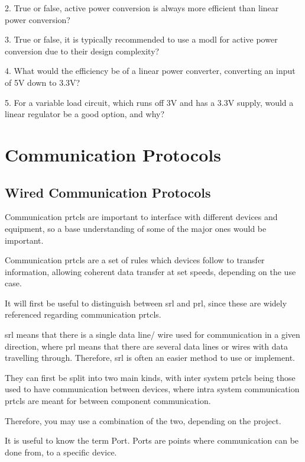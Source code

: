 \documentclass[a4paper,11pt]{report}
\begin{document}
2. True or false, active power conversion is always more efficient than linear power conversion?

3. True or false, it is typically recommended to use a \gls{modl} for active power conversion due to their design complexity?

4. What would the efficiency be of a linear power converter, converting an input of 5V down to 3.3V?

5. For a variable load circuit, which runs off 3V and has a 3.3V supply, would a linear regulator be a good option, and why?

\pagebreak

\section{Communication Protocols}

\vspace*{1\baselineskip}

\subsection{Wired Communication Protocols}

Communication \gls{prtcl}s are important to interface with different devices and equipment, so a base understanding of some of the major ones would be important.

Communication \gls{prtcl}s are a set of rules which devices follow to transfer information, allowing coherent data transfer at set speeds, depending on the use case.

It will first be useful to distinguish between \gls{srl} and \gls{prl}, since these are widely referenced regarding communication \gls{prtcl}s.

\gls{srl} means that there is a single data line/ wire used for communication in a given direction, where \gls{prl} means that there are several data lines or wires with data travelling through. Therefore, \gls{srl} is often an easier method to use or implement.

They can first be split into two main kinds, with inter system \gls{prtcl}s being those used to have communication between devices, where intra system communication \gls{prtcl}s are meant for between component communication.

Therefore, you may use a combination of the two, depending on the project.

It is useful to know the term Port. Ports are points where communication can be done from, to a specific device.
\end{document}
